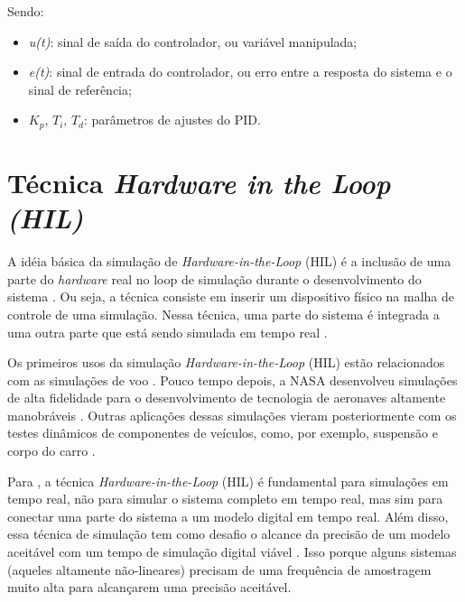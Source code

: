 Sendo:
\begin{itemize}
 \item \textit{u(t)}: sinal de saída do controlador, ou variável manipulada;
 \item \textit{e(t)}: sinal de entrada do controlador, ou erro entre a resposta do sistema e o sinal de referência;
 \item $K_p$, $T_i$, $T_d$: parâmetros de ajustes do PID.
\end{itemize}

\section{Técnica \textit{Hardware in the Loop (HIL)}}

A idéia básica da simulação de \textit{Hardware-in-the-Loop} (HIL) é a inclusão de 
uma parte do \textit{hardware} real no loop de simulação durante o desenvolvimento 
do sistema \cite{Bacic}. Ou seja, a técnica consiste em inserir um dispositivo físico 
na malha de controle de uma simulação. Nessa técnica, uma parte do sistema é integrada 
a uma outra parte que está sendo simulada em tempo real \cite{Abourida}.

Os primeiros usos da simulação \textit{Hardware-in-the-Loop} (HIL) estão relacionados com 
as simulações de voo \cite{Isermann}. Pouco tempo depois, a NASA desenvolveu simulações de alta 
fidelidade para o desenvolvimento de tecnologia de aeronaves altamente manobráveis \cite{Evans}. 
Outras aplicações dessas simulações vieram posteriormente com os testes dinâmicos de componentes 
de veículos, como, por exemplo, suspensão e corpo do carro \cite{Isermann}.

Para , a técnica \textit{Hardware-in-the-Loop} (HIL) é fundamental
para simulações em tempo real, não para simular o sistema completo em tempo real, mas sim
para conectar uma parte do sistema a um modelo digital em tempo real. Além disso, essa técnica
de simulação tem como desafio o alcance da precisão de um modelo aceitável com um tempo de simulação 
digital viável \cite{Abourida}. Isso porque alguns sistemas (aqueles altamente não-lineares)
precisam de uma frequência de amostragem muito alta para alcançarem uma precisão aceitável.

\clearpage